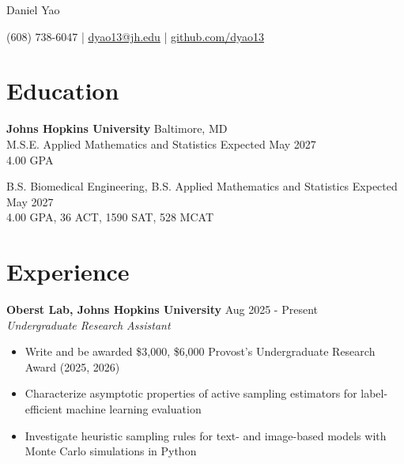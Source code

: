 \documentclass[11pt]{article}       %
\begin{document}

\centerline{\Huge Daniel Yao}

\vspace{5pt}

\centerline{(608) 738-6047 | \href{mailto:dyao13@jh.edu}{dyao13@jh.edu} | \href{https://github.com/dyao13/}{github.com/dyao13}}

\vspace{-9pt}

\section*{Education}

\textbf{Johns Hopkins University} \hfill Baltimore, MD \\
M.S.E. Applied Mathematics and Statistics \hfill Expected May 2027 \\
4.00 GPA

\vspace{9pt}

B.S. Biomedical Engineering, B.S. Applied Mathematics and Statistics \hfill Expected May 2027 \\
4.00 GPA, 36 ACT, 1590 SAT, 528 MCAT \\

\vspace{-9pt}




\section*{Experience}

\textbf{Oberst Lab, Johns Hopkins University} \hfill Aug 2025 - Present \\
\textit{Undergraduate Research Assistant} \vspace{-9pt} \\
\begin{itemize}
  \item Write and be awarded \$3,000, \$6,000 Provost's Undergraduate Research Award (2025, 2026)
  \item Characterize asymptotic properties of active sampling estimators for label-efficient machine learning evaluation
  \item Investigate heuristic sampling rules for text- and image-based models with Monte Carlo simulations in Python
\end{itemize}
\end{document}

